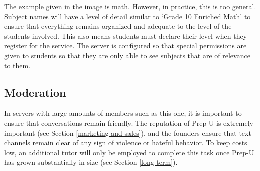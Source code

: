 \documentclass{business}
\begin{document}
    The example given in the image is math. However, in practice, this is too general. Subject names will have a level of detail similar to `Grade 10 Enriched Math' to ensure that everything remains organized and adequate to the level of the students involved. This also means students must declare their level when they register for the service. The server is configured so that special permissions are given to students so that they are only able to see subjects that are of relevance to them. 
    \subsection{Moderation}\label{moderation}
    In servers with large amounts of members such as this one, it is important to ensure that conversations remain friendly. The reputation of Prep-U is extremely important (see Section \ref{marketing-and-sales}), and the founders ensure that text channels remain clear of any sign of violence or hateful behavior. To keep costs low, an additional tutor will only be employed to complete this task once Prep-U has grown substantially in size (see Section \ref{long-term}).
\end{document}
